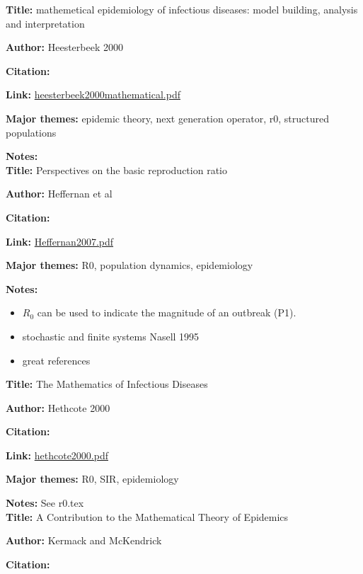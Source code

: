 \message{ !name(refs.tex)}\documentclass{article}
\begin{document}
\textbf{Title:}  mathemetical epidemiology of infectious diseases: model building, analysis and interpretation

\textbf{Author:}  Heesterbeek 2000

\textbf{Citation:}\cite{heesterbeek2000mathematical}

\textbf{Link:} \url{heesterbeek2000mathematical.pdf}

\textbf{Major themes:}  epidemic theory, next generation operator, r0,  structured populations

\textbf{Notes:}
\\

\textbf{Title:}  Perspectives on the basic reproduction ratio

\textbf{Author:} Heffernan et al

\textbf{Citation:}\cite{Heffernan2005}

\textbf{Link:} \url{Heffernan2007.pdf}

\textbf{Major themes:}  R0, population dynamics, epidemiology

\textbf{Notes:}
\begin{itemize}
\item  $R_0$ can be used to indicate the magnitude of an outbreak (P1).
\item stochastic and finite systems Nasell 1995
\item great references
\end{itemize}

\textbf{Title:} The Mathematics of Infectious Diseases

\textbf{Author:}  Hethcote 2000

\textbf{Citation:}\cite{hethcote2000}

\textbf{Link:} \url{hethcote2000.pdf}

\textbf{Major themes:}  R0, SIR, epidemiology

\textbf{Notes:} See r0.tex
\\

\textbf{Title:}  A Contribution to the Mathematical Theory of Epidemics

\textbf{Author:} Kermack and McKendrick

\textbf{Citation:} \cite{Kermack700}
\end{document}
